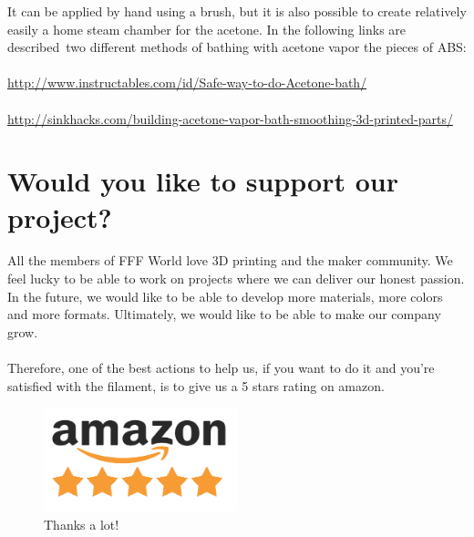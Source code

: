 \documentclass[11pt,a4paper]{article}
\begin{document}
It can be applied by hand using a brush, but it is also possible to create relatively easily a home steam chamber for the acetone. In the following links are described two different methods of bathing with acetone vapor the pieces of ABS:
\\\\
\url{http://www.instructables.com/id/Safe-way-to-do-Acetone-bath/}\\\\
\url{http://sinkhacks.com/building-acetone-vapor-bath-smoothing-3d-printed-parts/}
\section{Would you like to support our project?}
All the members of FFF World love 3D printing and the maker community. We feel lucky to be able to work on projects where we can deliver our honest passion. In the future, we would like to be able to develop more materials, more colors and more formats. Ultimately, we would like to be able to make our company grow.
\\\\
Therefore, one of the best actions to help us, if you want to do it and you’re satisfied with the filament, is to give us a 5 stars rating on amazon.
\begin{figure}[H]
\centering
\includegraphics[width=0.5\textwidth,cfbox=azul_marcos 1pt 0pt]{FOTOS/AMAZON_FIVE_STARS}
\caption*{Thanks a lot!}
\end{figure}
\end{document}

